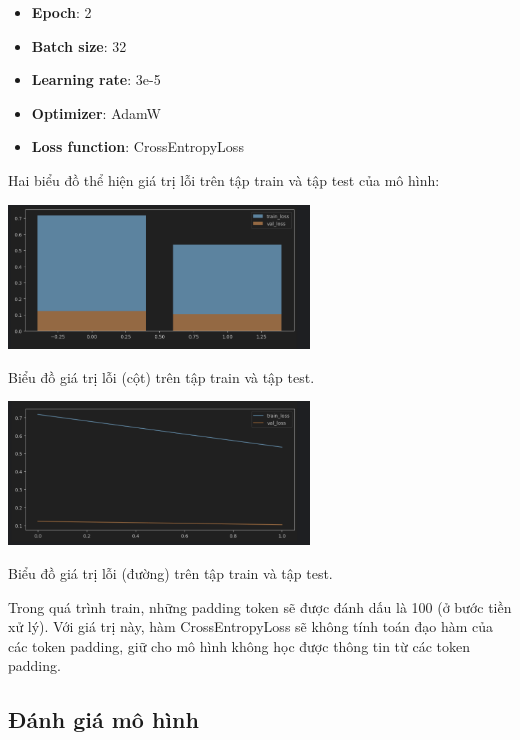 \documentclass[a4paper, 10pt]{article}
\begin{document}
\begin{itemize}
    \item \textbf{Epoch}: 2
    \item \textbf{Batch size}: 32
    \item \textbf{Learning rate}: 3e-5
    \item \textbf{Optimizer}: AdamW
    \item \textbf{Loss function}: CrossEntropyLoss
\end{itemize}



Hai biểu đồ thể hiện giá trị lỗi trên tập train và tập test của mô hình:
\vspace{0.5cm}

\begin{minipage}{\linewidth}
    \captionsetup{type=figure}
    \centering
    \includegraphics[width=8cm]{./bar_plot.png}
    \caption{Biểu đồ giá trị lỗi (cột) trên tập train và tập test.}
\end{minipage}

\begin{minipage}{\linewidth}
    \captionsetup{type=figure}
    \centering
    \includegraphics[width=8cm]{./plot.png}
    \caption{Biểu đồ giá trị lỗi (đường) trên tập train và tập test.}
\end{minipage}

Trong quá trình train, những padding token sẽ được đánh dấu là 100 (ở bước tiền xử lý).
Với giá trị này, hàm CrossEntropyLoss sẽ không tính toán đạo hàm của các token padding, 
giữ cho mô hình không học được thông tin từ các token padding.

\subsection{Đánh giá mô hình}
\end{document}
